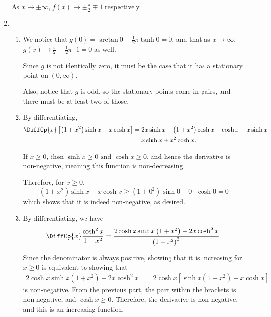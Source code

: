 \begin{enumerate}
          As \(x \to \pm \infty\), \(f(x) \to \pm \frac{\pi}{2} \mp 1\) respectively.

          \begin{center}
              
          \end{center}

    \item \begin{enumerate}
              \item We notice that \(g(0) = \arctan 0 - \frac{1}{2} \pi \tanh 0 = 0\), and that as \(x \to \infty\), \(g(x) \to \frac{\pi}{2} - \frac{1}{2}\pi \cdot 1 = 0\) as well.

                    Since \(g\) is not identically zero, it must be the case that it has a stationary point on \((0, \infty)\).

                    Also, notice that \(g\) is odd, so the stationary points come in pairs, and there must be at least two of those.

              \item By differentiating,
                    \begin{align*}
                        \DiffOp{x} \left[\left(1 + x^2\right) \sinh x - x \cosh x\right] & = 2x \sinh x + \left(1 + x^2\right) \cosh x - \cosh x - x \sinh x \\
                                                                                         & = x \sinh x + x^2 \cosh x.
                    \end{align*}

                    If \(x \geq 0\), then \(\sinh x \geq 0\) and \(\cosh x \geq 0\), and hence the derivative is non-negative, meaning this function is non-decreasing.

                    Therefore, for \(x \geq 0\),
                    \[
                        \left(1 + x^2\right) \sinh x - x \cosh x \geq \left(1 + 0^2\right) \sinh 0 - 0 \cdot \cosh 0 = 0
                    \]
                    which shows that it is indeed non-negative, as desired.

              \item By differentiating, we have
                    \[
                        \DiffOp{x} \frac{\cosh^2 x}{1 + x^2} = \frac{2 \cosh x \sinh x \left(1 + x^2\right) - 2x \cosh^2 x}{\left(1 + x^2\right)^2}.
                    \]

                    Since the denominator is always positive, showing that it is increasing for \(x \geq 0\) is equivalent to showing that
                    \begin{align*}
                        2 \cosh x \sinh x \left(1 + x^2\right) - 2x \cosh^2 x & = 2 \cosh x \left[\sinh x (1 + x^2) - x \cosh x\right]
                    \end{align*}
                    is non-negative. From the previous part, the part within the brackets is non-negative, and \(\cosh x \geq 0\). Therefore, the derivative is non-negative, and this is an increasing function.


\end{enumerate}
\end{enumerate}
